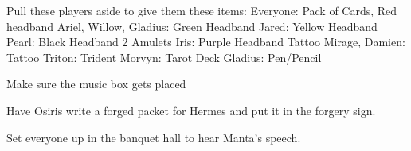 \documentclass[green]{NeptuneBall}
\begin{document}
\name{\gChecklist{}}

Pull these players aside to give them these items:
Everyone: Pack of Cards, Red headband
Ariel, Willow, Gladius: Green Headband
Jared: Yellow Headband
Pearl: Black Headband
			2	Amulets
Iris: Purple Headband
			Tattoo
Mirage, Damien: Tattoo
Triton: Trident
Morvyn: Tarot Deck
Gladius: Pen/Pencil
	
Make sure the music box gets placed	

Have Osiris write a forged packet for Hermes and put it in the forgery sign.

Set everyone up in the banquet hall to hear Manta's speech.
\end{document}
